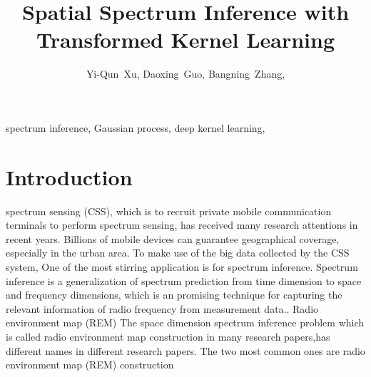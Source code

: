 \documentclass[journal, oneside, twocolumn]{IEEEtran}
\date{}
\title{Spatial Spectrum Inference with Transformed Kernel Learning}
\begin{document}
\author{
  Yi-Qun~Xu,
  Daoxing~Guo,%
  Bangning~Zhang,%

}


\maketitle


\begin{abstract}

\end{abstract}


\begin{IEEEkeywords}
  spectrum inference, Gaussian process, deep kernel learning,
\end{IEEEkeywords}

\section{Introduction}
 spectrum sensing (CSS), which is to recruit private mobile communication terminals to perform spectrum sensing, has received many research attentions \cite{Ding2014, Jin2018, Han2019, Hu2020, Amin2020} in recent years. Billions of mobile devices can guarantee geographical coverage, especially in the urban area. To make use of the big data collected by the CSS system, One of the most stirring application is for spectrum inference. Spectrum inference is a generalization of spectrum prediction from time dimension to space and frequency dimensions, which is an promising technique for capturing the relevant information of radio frequency from measurement data.\cite{Ding2018}. Radio environment map (REM)
The space dimension spectrum inference problem which is called radio environment map construction in many research papers,has different names in different research papers. The two most common ones are radio environment map (REM) construction \cite{Phillips2012, Pesko2014, Sato2017, Li2018, Katagiri2020}
\end{document}
